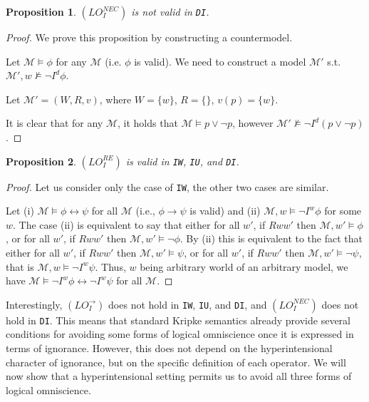 \documentclass{article}
\newtheorem{prop}{Proposition}
\begin{document}
\begin{prop}

$(LO^{NEC}_{I})$ is not valid in \texttt{DI}.

\end{prop}

\begin{proof}

We prove this proposition by constructing a countermodel.

Let $\mathcal{M} \models \phi $ for any $\mathcal{M}$ (i.e. $\phi$ is valid). We need to construct a model $\mathcal{M}'$ s.t. $\mathcal{M}', w \not \models \neg I^{d}\phi$.

Let $\mathcal{M}' = (W, R, v)$, where $W = \{w\}$, $R = \{\}$, $v(p) = \{ w\}$. 

It is clear that for any $\mathcal{M}$, it holds that $\mathcal{M} \models p \vee \neg p$, however $\mathcal{M}' \not \models \neg I^{d} (p \vee \neg p)$.

\end{proof}

\begin{prop}

$(LO^{RE}_{I})$ is valid in \texttt{IW}, \texttt{IU}, and \texttt{DI}.

\end{prop}

\begin{proof}

Let us consider only the case of \texttt{IW}, the other two cases are similar. 

Let (i) $\mathcal{M} \models \phi \leftrightarrow \psi$ for all $\mathcal{M}$ (i.e., $\phi \rightarrow \psi$ is valid) and (ii) $\mathcal{M}, w \models \neg I^{w} \phi$ for some $w$. The case (ii) is equivalent to say that either for all $w'$, if $Rww'$ then $\mathcal{M}, w' \models \phi$, or for all $w'$, if $Rww'$ then $\mathcal{M}, w' \models \neg \phi$. By (ii) this is equivalent to the fact that either for all $w'$, if $Rww'$ then $\mathcal{M}, w' \models \psi$, or for all $w'$, if $Rww'$ then $\mathcal{M}, w' \models \neg \psi$, that is $\mathcal{M}, w \models \neg I^{w} \psi$. Thus, $w$ being arbitrary world of an arbitrary model, we have $\mathcal{M} \models \neg I^{w} \phi \leftrightarrow \neg I^{w} \psi$ for all $\mathcal{M}$.

\end{proof}


Interestingly, $(LO^{\rightarrow}_{I})$ does not hold in \texttt{IW}, \texttt{IU}, and \texttt{DI}, and $(LO^{NEC}_{I})$ does not hold in \texttt{DI}. This means that standard Kripke semantics already provide several conditions for avoiding some forms of logical omniscience once it is expressed in terms of ignorance. However, this does not depend on the hyperintensional character of ignorance, but on the specific definition of each operator. We will now show that a hyperintensional setting permits us to avoid all three forms of logical omniscience.
\end{document}
